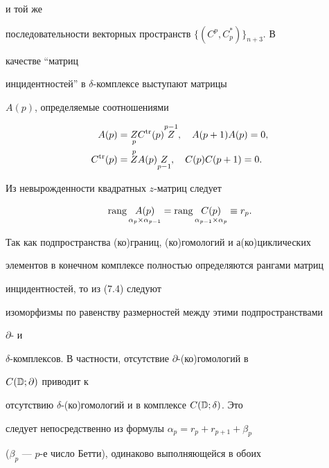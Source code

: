 и той же 


последовательности векторных пространств $\{(C^p,C^*_p)\}_{n+3}$. В 


качестве ``матриц 


инцидентностей'' в $\delta$-комплексе выступают матрицы  


$A(p)$, определяемые соотношениями


\begin{equation} 


\begin{split} 


A(p)&=\down{p}{Z}C^{\tr}(p)\up{p-1}{Z},\quad 


A(p+1)A(p)=0,\\ 


C^{\tr}(p)&=\up{p}{Z}A(p)\down{p-1}{Z},\quad 


C(p)C(p+1)=0. 


\end{split} 


\end{equation} 


 


Из невырожденности квадратных $z$-матриц следует


\begin{equation} 


\rang\down{\alpha_p\times\alpha_{p-1}}{A(p)}= 


\rang\down{\alpha_{p-1}\times\alpha_p}{C(p)}\equiv r_p. 


\end{equation} 


Так как подпространства (ко)границ, (ко)гомологий и а(ко)циклических 


элементов в конечном комплексе полностью определяются рангами матриц 


инцидентностей, то из (7.4) следуют  


изоморфизмы по равенству размерностей между этими подпространствами 


$\partial$- и 


$\delta$-комплексов. В частности, отсутствие $\partial$-(ко)гомологий в 


$C(\Bbb D;\partial)$ приводит к 


отсутствию $\delta$-(ко)гомологий и в комплексе $C(\Bbb D;\delta)$. Это 


следует непосредственно из формулы $\alpha_p=r_p+r_{p+1}+\beta_p$ 


($\beta_p$ --- $p$-е число Бетти), одинаково выполняющейся в обоих 


